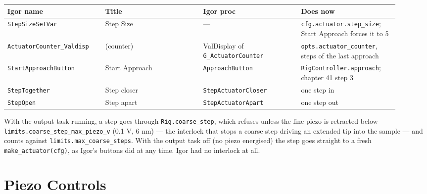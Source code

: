 \small\setlength{\LTleft}{0pt}\setlength{\LTright}{\fill}
\begin{longtable}{@{}>{\raggedright\arraybackslash}p{0.230\linewidth}>{\raggedright\arraybackslash}p{0.230\linewidth}>{\raggedright\arraybackslash}p{0.230\linewidth}>{\raggedright\arraybackslash}p{0.230\linewidth}@{}}
\toprule
\textbf{Igor name} & \textbf{Title} & \textbf{Igor proc} & \textbf{Does now} \\
\midrule\endhead
\texttt{Step\discretionary{}{}{}Size\discretionary{}{}{}Set\discretionary{}{}{}Var} & Step Size & --- & \texttt{cfg.\discretionary{}{}{}actuator.\discretionary{}{}{}step\_\discretionary{}{}{}size}; Start Approach forces it to 5 \\
\texttt{Actuator\discretionary{}{}{}Counter\_\discretionary{}{}{}Valdisp} & (counter) & ValDisplay of \texttt{G\_\discretionary{}{}{}Actuator\discretionary{}{}{}Counter} & \texttt{opts.\discretionary{}{}{}actuator\_\discretionary{}{}{}counter}, steps of the last approach \\
\texttt{Start\discretionary{}{}{}Approach\discretionary{}{}{}Button} & Start Approach & \texttt{Approach\discretionary{}{}{}Button} & \texttt{Rig\discretionary{}{}{}Controller.\discretionary{}{}{}approach}; chapter 41 step 3 \\
\texttt{Step\discretionary{}{}{}Together} & Step closer & \texttt{Step\discretionary{}{}{}Actuator\discretionary{}{}{}Closer} & one step in \\
\texttt{Step\discretionary{}{}{}Open} & Step apart & \texttt{Step\discretionary{}{}{}Actuator\discretionary{}{}{}Apart} & one step out \\
\bottomrule
\end{longtable}
\normalsize

With the output task running, a step goes through \texttt{Rig.\discretionary{}{}{}coarse\_\discretionary{}{}{}step}, which refuses unless the fine piezo is retracted below \texttt{limits.\discretionary{}{}{}coarse\_\discretionary{}{}{}step\_\discretionary{}{}{}max\_\discretionary{}{}{}piezo\_\discretionary{}{}{}v} (0.1 V, 6 nm) --- the interlock that stops a coarse step driving an extended tip into the sample --- and counts against \texttt{limits.\discretionary{}{}{}max\_\discretionary{}{}{}coarse\_\discretionary{}{}{}steps}. With the output task off (no piezo energised) the step goes straight to a fresh \texttt{make\_\discretionary{}{}{}actuator(cfg)}, as Igor's buttons did at any time. Igor had no interlock at all.

\section{Piezo Controls}

